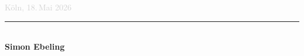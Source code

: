 \documentclass[11pt,a4paper,openany]{report}
\begin{document}
\vspace{1.2em}
\nopagebreak
\noindent\nopagebreak
\begin{minipage}{\textwidth}
  {\sffamily\small\textcolor{lightgray}{Köln, 18.\,Mai 2026}}\\[1.2em]
  \rule{6cm}{0.3pt}\\[0.2em]
  {\sffamily\bfseries Simon Ebeling}\quad{\small\textcolor{lightgray}|}
\end{minipage}
\end{document}
